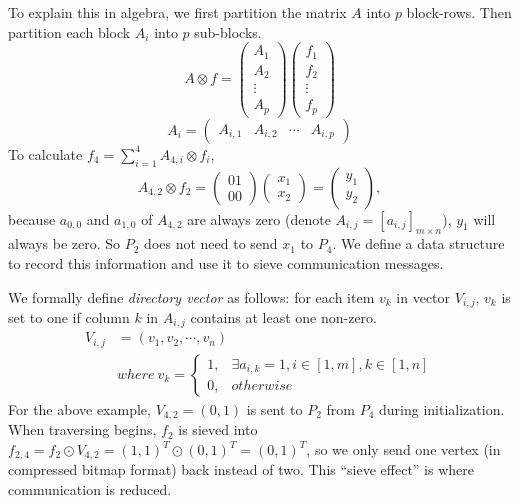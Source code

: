 \documentclass[conference]{IEEEtran}
\begin{document}
To explain this in algebra, we first partition the matrix $A$ into $p$
block-rows. Then partition each block $A_i$ into $p$ sub-blocks.
\begin{equation}
  \label{eq:abc}
  A \otimes f =
 \begin{pmatrix}   A_1 \\   A_2 \\   \vdots \\   A_p \end{pmatrix}
 \begin{pmatrix}   f_1 \\   f_2 \\   \vdots \\   f_p \end{pmatrix}
\end{equation}
\begin{equation}
  \label{eq:sub-block}
  A_i = \begin{pmatrix} A_{i,1} & A_{i,2} & \cdots & A_{i,p} \end{pmatrix}
\end{equation}
To calculate $f_4 = \sum_{i=1}^{4} A_{4,i} \otimes f_i$, 
\begin{equation}
  \label{eq:a4}
  A_{4,2} \otimes f_2 = \begin{pmatrix} 01 \\ 00 \end{pmatrix} 
  \begin{pmatrix} x_1 \\ x_2 \end{pmatrix} = \begin{pmatrix} y_1 \\ y_2 \end{pmatrix},
\end{equation}
because $a_{0,0}$ and $a_{1,0}$ of $A_{4,2}$ are always zero (denote
$A_{i,j}=[a_{i,j}]_{m \times n}$), $y_1$ will always be zero. So $P_2$ does
not need to send $x_1$ to $P_4$. We define a data structure to record this
information and use it to sieve communication messages.

We formally define \textit{directory vector} as follows: for each item $v_k$
in vector $V_{i,j}$, $v_k$ is set to one if column $k$ in $A_{i,j}$ contains
at least one non-zero.
\begin{align}
  \label{eq:dir-vec}
V_{i,j} &= (v_1,v_2,\cdots,v_n) \\
& where \ v_k =
  \begin{cases}
1, & \exists a_{i,k}=1, i \in [1,m], k \in [1,n] \\
0, & otherwise
  \end{cases}\nonumber
\end{align}
For the above example, $V_{4,2}=(0,1)$ is sent to $P_2$ from $P_4$ during
initialization. When traversing begins, $f_2$ is sieved into $f_{2,4}=f_2 \odot
V_{4,2}=(1,1)^T \odot (0,1)^T = (0,1)^T$, so we only send one vertex (in
compressed bitmap format) back instead of two. This ``sieve effect'' is where
communication is reduced.
\end{document}
